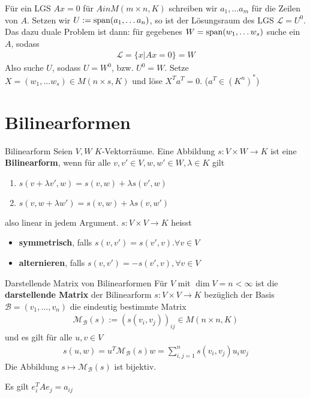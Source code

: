 Für ein LGS $Ax = 0$ für $A in M(m\times n,K)$ schreiben wir $a_1, \ldots a_m$ für die Zeilen von $A$. Setzen wir $U := \operatorname{span}(a_1, \ldots a_n)$, so ist der Lösungsraum des LGS $\mathcal{L} = U^0$. Das dazu duale Problem ist dann:
für gegebenes $W = \operatorname{span}(w_1, \ldots w_s)$ suche ein $A$, sodass
\begin{align*}
    \mathcal{L} = \{x \big\vert Ax = 0\} = W
\end{align*}
Also suche $U$, sodass $U = W^0$, bzw. $U^0 = W$. Setze $X = (w_1, \ldots w_s) \in M(n\times s,K)$ und löse $X^T a^T = 0$. ($a^T \in (K^n)^*$)




\section{Bilinearformen}

\begin{definition}{Bilinearform}
    Seien $V,W$ $K$-Vektorräume. Eine Abbildung $s: V \times W \to K$ ist eine \textbf{Bilinearform}, wenn für alle $v,v' \in V, w,w' \in W, \lambda \in K$ gilt
    \begin{enumerate}
        \item   $s(v+ \lambda v',w) = s(v,w) + \lambda s(v',w)$
        \item   $s(v, w + \lambda w') = s(v,w) + \lambda s(v,w')$
    \end{enumerate}
    also linear in jedem Argument.
    $s: V \times V \to K$ heisst 
    \begin{itemize}
        \item   \textbf{symmetrisch}, falls $s(v,v') = s(v',v). \forall v \in V$
        \item   \textbf{alternieren}, falls $s(v,v') = -s(v',v), \forall v \in V$
    \end{itemize}
\end{definition}

\begin{definition}{Darstellende Matrix von Bilinearformen}
    Für $V$ mit $\dim V = n < \infty$ ist die \textbf{darstellende Matrix} der Bilinearform $s: V \times V \to K$ bezüglich der Basis $\mathcal{B} = (v_{1}, \ldots, v_{n})$ die eindeutig bestimmte Matrix 
    \begin{align*}
        \mathcal{M}_{\mathcal{B}}(s) := \left(s(v_i,v_j)\right)_{ij} \in M(n\times n,K)
    \end{align*}
    und es gilt für alle $u,v \in V$
    \begin{align*}
        s(u,w) = u^T \mathcal{M}_{\mathcal{B}}(s)w = \sum_{i,j = 1}^{n} s(v_i,v_j)u_iw_j
    \end{align*}
    Die Abbildung $s \mapsto \mathcal{M}_{\mathcal{B}}(s)$ ist bijektiv.
\end{definition}
Es gilt $e_i^T A e_j = a_{ij}$

